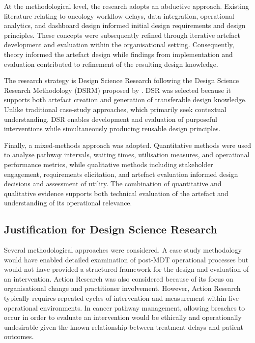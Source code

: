 At the methodological level, the research adopts an abductive approach. Existing literature relating to oncology workflow delays, data integration, operational analytics, and dashboard design informed initial design requirements and design principles. These concepts were subsequently refined through iterative artefact development and evaluation within the organisational setting. Consequently, theory informed the artefact design while findings from implementation and evaluation contributed to refinement of the resulting design knowledge. 

The research strategy is Design Science Research following the Design Science Research Methodology (DSRM) proposed by \cite{peffers2007}. DSR was selected because it supports both artefact creation and generation of transferable design knowledge. Unlike traditional case-study approaches, which primarily seek contextual understanding, DSR enables development and evaluation of purposeful interventions while simultaneously producing reusable design principles. 

Finally, a mixed-methods approach was adopted. Quantitative methods were used to analyse pathway intervals, waiting times, utilisation measures, and operational performance metrics, while qualitative methods including stakeholder engagement, requirements elicitation, and artefact evaluation informed design decisions and assessment of utility. The combination of quantitative and qualitative evidence supports both technical evaluation of the artefact and understanding of its operational relevance.

\subsection{Justification for Design Science Research}
Several methodological approaches were considered. A case study methodology would have enabled detailed examination of post-MDT operational processes but would not have provided a structured framework for the design and evaluation of an intervention. Action Research was also considered because of its focus on organisational change and practitioner involvement. However, Action Research typically requires repeated cycles of intervention and measurement within live operational environments. In cancer pathway management, allowing breaches to occur in order to evaluate an intervention would be ethically and operationally undesirable given the known relationship between treatment delays and patient outcomes. 

